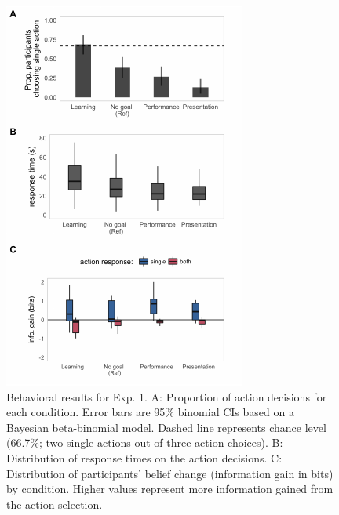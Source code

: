 \documentclass[10pt, letterpaper]{article}
\newenvironment{CodeChunk}{}{}
\begin{document}
\begin{CodeChunk}
\begin{figure}[H]

{\centering \includegraphics[width=0.86\linewidth]{figs/e1_behav_results_plot-1} 

}

\caption[Behavioral results for Exp]{Behavioral results for Exp. 1. A: Proportion of action decisions for each condition. Error bars are 95\% binomial CIs based on a Bayesian beta-binomial model. Dashed line represents chance level (66.7\%; two single actions out of three action choices). B: Distribution of response times on the action decisions. C: Distribution of participants' belief change (information gain in bits) by condition. Higher values represent more information gained from the action selection.}\label{fig:e1_behav_results_plot}
\end{figure}
\end{CodeChunk}
\end{document}
